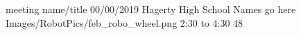 \insertmeeting 
	{meeting name/title}
    {00/00/2019}
	{Hagerty High School}
	{Names go here}
	{Images/RobotPics/feb_robo_wheel.png}
	{2:30 to 4:30}
	{48}
	



